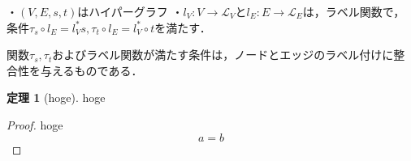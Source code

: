 \documentclass[uplatex,dvipdfmx,ja=standard]{bxjsarticle}
\theoremstyle{definition}
\newtheorem{theorem}{定理}
\numberwithin{theorem}{section}  %
\numberwithin{equation}{section} %
\begin{document}
    ・$(V,E,s,t)$はハイパーグラフ
    ・$l_V : V \to \mathcal{L}_V$と$l_E : E \to \mathcal{L}_E$は，ラベル関数で，条件$\tau_s \circ l_E = l^*_V s, \tau_t \circ l_E = l^*_V \circ t$を満たす．

関数$\tau_s, \tau_t$およびラベル関数が満たす条件は，ノードとエッジのラベル付けに整合性を与えるものである．






\begin{theorem}[hoge]
    hoge
\end{theorem}

\begin{proof}
    hoge
    \begin{equation}
        a = b
    \end{equation}
\end{proof}







%
%
\end{document}

